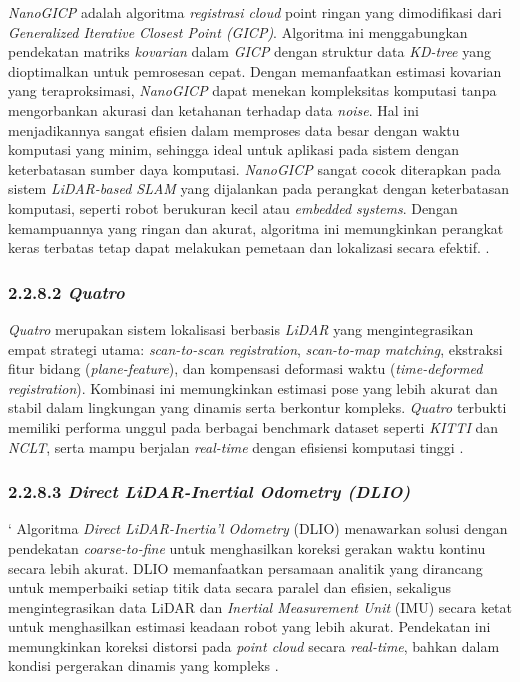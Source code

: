 \emph{NanoGICP} adalah algoritma \emph{registrasi cloud} point ringan yang dimodifikasi dari \emph{Generalized Iterative Closest Point (GICP)}. Algoritma ini menggabungkan pendekatan matriks \emph{kovarian} dalam \emph{GICP} dengan struktur data \emph{KD-tree} yang dioptimalkan untuk pemrosesan cepat. Dengan memanfaatkan estimasi kovarian yang teraproksimasi, \emph{NanoGICP} dapat menekan kompleksitas komputasi tanpa mengorbankan akurasi dan ketahanan terhadap data \emph{noise}. Hal ini menjadikannya sangat efisien dalam memproses data besar dengan waktu komputasi yang minim, sehingga ideal untuk aplikasi pada sistem dengan keterbatasan sumber daya komputasi. \emph{NanoGICP} sangat cocok diterapkan pada sistem \emph{LiDAR-based SLAM} yang dijalankan pada perangkat dengan keterbatasan komputasi, seperti robot berukuran kecil atau \emph{embedded systems}. Dengan kemampuannya yang ringan dan akurat, algoritma ini memungkinkan perangkat keras terbatas tetap dapat melakukan pemetaan dan lokalizasi secara efektif. \cite{koide2021nanogicp}.



\subsubsection{2.2.8.2 \emph{Quatro}}
\emph{Quatro} merupakan sistem lokalisasi berbasis \emph{LiDAR} yang mengintegrasikan empat strategi utama: \emph{scan-to-scan registration}, \emph{scan-to-map matching}, ekstraksi fitur bidang (\emph{plane-feature}), dan kompensasi deformasi waktu (\emph{time-deformed registration}). Kombinasi ini memungkinkan estimasi pose yang lebih akurat dan stabil dalam lingkungan yang dinamis serta berkontur kompleks. \emph{Quatro} terbukti memiliki performa unggul pada berbagai benchmark dataset seperti \emph{KITTI} dan \emph{NCLT}, serta mampu berjalan \emph{real-time} dengan efisiensi komputasi tinggi \cite{kim2022quatro}.


\subsubsection{2.2.8.3 \emph{Direct LiDAR-Inertial Odometry (DLIO)}}`
Algoritma \emph{Direct LiDAR-Inertia'l Odometry} (DLIO) menawarkan solusi dengan pendekatan \emph{coarse-to-fine} untuk menghasilkan koreksi gerakan waktu kontinu secara lebih akurat. DLIO memanfaatkan persamaan analitik yang dirancang untuk memperbaiki setiap titik data secara paralel dan efisien, sekaligus mengintegrasikan data LiDAR dan \emph{Inertial Measurement Unit} (IMU) secara ketat untuk menghasilkan estimasi keadaan robot yang lebih akurat. Pendekatan ini memungkinkan koreksi distorsi pada \emph{point cloud} secara \emph{real-time}, bahkan dalam kondisi pergerakan dinamis yang kompleks \cite{chen2022dlio}.


